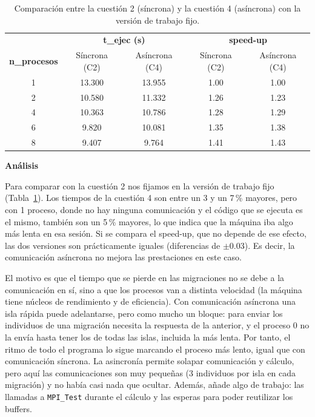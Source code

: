 \documentclass[12pt]{article}
\begin{document}
\begin{enumerate}
\begin{table}[htbp]
\centering
\begin{tabular}{c|cc|cc}
\toprule
& \multicolumn{2}{c|}{\textbf{t\_ejec (s)}} & \multicolumn{2}{c}{\textbf{speed-up}} \\
\textbf{n\_procesos} & Síncrona (C2) & Asíncrona (C4) & Síncrona (C2) & Asíncrona (C4) \\
\midrule
1 & 13.300 & 13.955 & 1.00 & 1.00 \\
2 & 10.580 & 11.332 & 1.26 & 1.23 \\
4 & 10.363 & 10.786 & 1.28 & 1.29 \\
6 & 9.820 & 10.081 & 1.35 & 1.38 \\
8 & 9.407 & 9.764 & 1.41 & 1.43 \\
\bottomrule
\end{tabular}
\caption{Comparación entre la cuestión 2 (síncrona) y la cuestión 4 (asíncrona) con la versión de trabajo fijo.}
\label{tab:c4_comparacion}
\end{table}

\vspace{0.5cm}

\medskip
\noindent\textbf{Análisis}\par
\smallskip

Para comparar con la cuestión 2 nos fijamos en la versión de trabajo fijo (Tabla~\ref{tab:c4_comparacion}). Los tiempos de la cuestión 4 son entre un 3 y un 7\,\% mayores, pero con 1 proceso, donde no hay ninguna comunicación y el código que se ejecuta es el mismo, también son un 5\,\% mayores, lo que indica que la máquina iba algo más lenta en esa sesión. Si se compara el speed-up, que no depende de ese efecto, las dos versiones son prácticamente iguales (diferencias de $\pm 0.03$). Es decir, la comunicación asíncrona no mejora las prestaciones en este caso.

El motivo es que el tiempo que se pierde en las migraciones no se debe a la comunicación en sí, sino a que los procesos van a distinta velocidad (la máquina tiene núcleos de rendimiento y de eficiencia). Con comunicación asíncrona una isla rápida puede adelantarse, pero como mucho un bloque: para enviar los individuos de una migración necesita la respuesta de la anterior, y el proceso 0 no la envía hasta tener los de todas las islas, incluida la más lenta. Por tanto, el ritmo de todo el programa lo sigue marcando el proceso más lento, igual que con comunicación síncrona. La asincronía permite solapar comunicación y cálculo, pero aquí las comunicaciones son muy pequeñas (3 individuos por isla en cada migración) y no había casi nada que ocultar. Además, añade algo de trabajo: las llamadas a \texttt{MPI\_Test} durante el cálculo y las esperas para poder reutilizar los buffers.


\end{enumerate}
\end{document}
